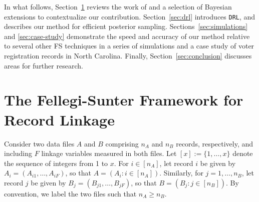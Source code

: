 \documentclass[12pt,letterpaper]{article}
\newcommand{\1}[1]{\mathbb{I}\!\left[#1\right]} %
\begin{document}
In what follows, Section~\ref{sec:prior-work} reviews the work of \cite{fellegi_theory_1969} and a selection of Bayesian extensions to contextualize our contribution. Section~\ref{sec:drl} introduces \texttt{DRL}, and describes our method for efficient posterior sampling. Sections~\ref{sec:simulations} and \ref{sec:case-study} demonstrate the speed and accuracy of our method relative to several other FS techniques in a series of simulations and a case study of voter registration records in North Carolina. Finally, Section~\ref{sec:conclusion} discusses areas for further research.





\section{The Fellegi-Sunter Framework for Record Linkage}\label{sec:prior-work}

Consider two data files $A$ and $B$ comprising $n_A$ and $n_B$ records, respectively, and including $F$ linkage variables measured in both files. Let $[x] := \{1, \ldots, x\}$ denote the sequence of integers from 1 to $x$. For $i \in [n_A]$, let record $i$ be given by $A_i = (A_{i1}, \dots, A_{iF})$, so that $A = (A_i : i \in [n_A])$.  Similarly, for $j=1, \dots, n_B$, let record $j$ be given by $B_j = (B_{j1}, \dots, B_{jF})$, so that $B = (B_j : j \in [n_B])$. By convention, we label the two files such that $n_A \geq n_B$.
\end{document}

